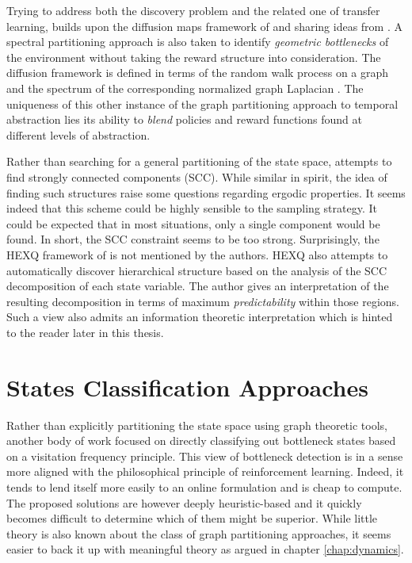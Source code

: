 Trying to address both the discovery problem and the related one of transfer learning, \cite{Bouvrie2012} builds upon the diffusion maps framework of \cite{Coifman2006} and sharing ideas from \cite{Mahadevan2007}. A spectral partitioning approach is also taken to identify \textit{geometric bottlenecks} of the environment without taking the reward structure into consideration. The diffusion framework is defined in terms of the random walk process on a graph and the spectrum of the corresponding normalized graph Laplacian \cite{Chung1997}. The uniqueness of this other instance of the graph partitioning approach to temporal abstraction lies its ability to \textit{blend} policies and reward functions found at different levels of abstraction. 

Rather than searching for a general partitioning of the state space, \cite{Kazemitabar2009} attempts to find strongly connected components (SCC). While similar in spirit, the idea of finding such structures raise some questions regarding ergodic properties. It seems indeed that this scheme could be highly sensible to the sampling strategy. It could be expected that in most situations, only a single component would be found. In short, the SCC constraint seems to be too strong. Surprisingly, the \textsc{HEXQ} framework of \cite{Hengst2002} is not mentioned by  the authors. \textsc{HEXQ} also attempts to automatically discover hierarchical structure based on the analysis of the SCC decomposition of each state variable. The author gives an interpretation of the resulting decomposition in terms of maximum \textit{predictability} within those regions. Such a view also admits an information theoretic interpretation which is hinted to the reader later in this thesis.

\section{States Classification Approaches}
Rather than explicitly partitioning the state space using graph theoretic tools, another body of work focused on directly classifying out bottleneck states based on a visitation frequency principle. This view of bottleneck detection is in a sense more aligned with the philosophical principle of reinforcement learning. Indeed, it tends to lend itself more easily to an online formulation and is cheap to compute. The proposed solutions are however deeply heuristic-based and it quickly becomes difficult to determine which of them might be superior. While little theory is also known about the class of graph partitioning approaches, it seems easier to back it up with meaningful theory as argued in chapter \ref{chap:dynamics}.

